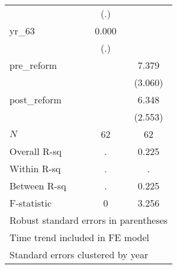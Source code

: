 \begin{table}[htbp]
\begin{tabular}{l*{2}{c}}
            &         (.)         &                     \\
yr\_63       &       0.000         &                     \\
            &         (.)         &                     \\
pre\_reform  &                     &       7.379\sym{**} \\
            &                     &     (3.060)         \\
post\_reform &                     &       6.348\sym{**} \\
            &                     &     (2.553)         \\
\hline
\(N\)       &          62         &          62         \\
Overall R-sq&           .         &       0.225         \\
Within R-sq &           .         &           .         \\
Between R-sq&           .         &       0.225         \\
F-statistic &           0         &       3.256         \\
\hline\hline
\multicolumn{3}{l}{\footnotesize Robust standard errors in parentheses}\\
\multicolumn{3}{l}{\footnotesize Time trend included in FE model}\\
\multicolumn{3}{l}{\footnotesize Standard errors clustered by year}\\
\end{tabular}
\end{table}
